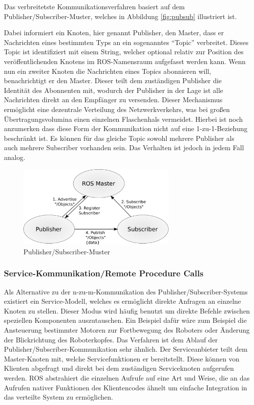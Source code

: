Das verbreitetste Kommunikationsverfahren basiert auf dem Publisher/Subscriber-Muster, welches in Abbildung \vref{fig:pubsub} illustriert ist.

Dabei informiert ein Knoten, hier genannt Publisher, den Master, dass er Nachrichten eines bestimmten Typs an ein sogenanntes "`Topic"' verbreitet.
Dieses Topic ist identifiziert mit einem String, welcher optional relativ zur Position des veröffentlichenden Knotens im ROS-Namensraum aufgefasst werden kann.
Wenn nun ein zweiter Knoten die Nachrichten eines Topics abonnieren will, benachrichtigt er den Master.
Dieser teilt dem zuständigen Publisher die Identität des Abonnenten mit, wodurch der Publisher in der Lage ist alle Nachrichten direkt an den Empfänger zu versenden.
Dieser Mechanismus ermöglicht eine dezentrale Verteilung des Netzwerkverkehrs, was bei großen Übertragungsvolumina einen einzelnen Flaschenhals vermeidet.
Hierbei ist noch anzumerken dass diese Form der Kommunikation nicht auf eine 1-zu-1-Beziehung beschränkt ist.
Es können für das gleiche Topic sowohl mehrere Publisher als auch mehrere Subscriber vorhanden sein.
Das Verhalten ist jedoch in jedem Fall analog.

\begin{figure}
  \centering
  \includegraphics[width=0.7\textwidth]{bilder/pubsub.pdf}
  \caption{Publisher/Subscriber-Muster}
  \label{fig:pubsub}
\end{figure}

\subsubsection{Service-Kommunikation/Remote Procedure Calls}
Als Alternative zu der n-zu-m-Kommunikation des Publisher/Subscriber-Systems existiert ein Service-Modell, welches es ermöglicht direkte Anfragen an einzelne Knoten zu stellen.
Dieser Modus wird häufig benutzt um direkte Befehle zwischen speziellen Komponenten auszutauschen.
Ein Beispiel dafür wäre zum Beispiel die Ansteuerung bestimmter Motoren zur Fortbewegung des Roboters oder Änderung der Blickrichtung des Roboterkopfes.
Das Verfahren ist dem Ablauf der Publisher/Subscriber-Kommunikation sehr ähnlich. Der Serviceanbieter teilt dem Master-Knoten mit, welche Servicefunktionen er bereitstellt.
Diese können von Klienten abgefragt und direkt bei dem zuständigen Serviceknoten aufgerufen werden.
ROS abstrahiert die einzelnen Aufrufe auf eine Art und Weise, die an das Aufrufen nativer Funktionen des Klientencodes ähnelt um einfache Integration in das verteilte System zu ermöglichen.

